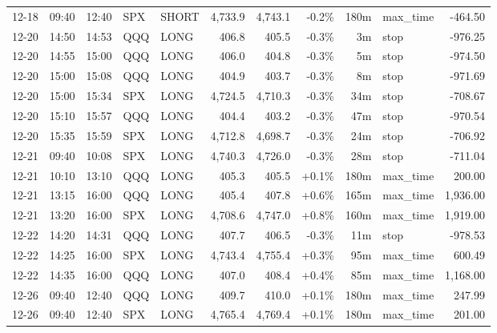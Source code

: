 \documentclass[11pt,a4paper,twoside]{article}
\begin{document}
\begin{center}
\begin{longtable}{>{\color{txtmain}}l l l l l r r r r >{\color{txtmain}}l r}
12-18 & 09:40 & 12:40 & SPX & SHORT & 4,733.9 & 4,743.1 & \textcolor{lossred}{-0.2\%} & 180m & max\_time & \textcolor{lossred}{-464.50} \\
12-20 & 14:50 & 14:53 & QQQ & LONG & 406.8 & 405.5 & \textcolor{lossred}{-0.3\%} & 3m & stop & \textcolor{lossred}{-976.25} \\
12-20 & 14:55 & 15:00 & QQQ & LONG & 406.0 & 404.8 & \textcolor{lossred}{-0.3\%} & 5m & stop & \textcolor{lossred}{-974.50} \\
12-20 & 15:00 & 15:08 & QQQ & LONG & 404.9 & 403.7 & \textcolor{lossred}{-0.3\%} & 8m & stop & \textcolor{lossred}{-971.69} \\
12-20 & 15:00 & 15:34 & SPX & LONG & 4,724.5 & 4,710.3 & \textcolor{lossred}{-0.3\%} & 34m & stop & \textcolor{lossred}{-708.67} \\
12-20 & 15:10 & 15:57 & QQQ & LONG & 404.4 & 403.2 & \textcolor{lossred}{-0.3\%} & 47m & stop & \textcolor{lossred}{-970.54} \\
12-20 & 15:35 & 15:59 & SPX & LONG & 4,712.8 & 4,698.7 & \textcolor{lossred}{-0.3\%} & 24m & stop & \textcolor{lossred}{-706.92} \\
12-21 & 09:40 & 10:08 & SPX & LONG & 4,740.3 & 4,726.0 & \textcolor{lossred}{-0.3\%} & 28m & stop & \textcolor{lossred}{-711.04} \\
12-21 & 10:10 & 13:10 & QQQ & LONG & 405.3 & 405.5 & \textcolor{wingreen}{+0.1\%} & 180m & max\_time & \textcolor{wingreen}{200.00} \\
12-21 & 13:15 & 16:00 & QQQ & LONG & 405.4 & 407.8 & \textcolor{wingreen}{+0.6\%} & 165m & max\_time & \textcolor{wingreen}{1,936.00} \\
12-21 & 13:20 & 16:00 & SPX & LONG & 4,708.6 & 4,747.0 & \textcolor{wingreen}{+0.8\%} & 160m & max\_time & \textcolor{wingreen}{1,919.00} \\
12-22 & 14:20 & 14:31 & QQQ & LONG & 407.7 & 406.5 & \textcolor{lossred}{-0.3\%} & 11m & stop & \textcolor{lossred}{-978.53} \\
12-22 & 14:25 & 16:00 & SPX & LONG & 4,743.4 & 4,755.4 & \textcolor{wingreen}{+0.3\%} & 95m & max\_time & \textcolor{wingreen}{600.49} \\
12-22 & 14:35 & 16:00 & QQQ & LONG & 407.0 & 408.4 & \textcolor{wingreen}{+0.4\%} & 85m & max\_time & \textcolor{wingreen}{1,168.00} \\
12-26 & 09:40 & 12:40 & QQQ & LONG & 409.7 & 410.0 & \textcolor{wingreen}{+0.1\%} & 180m & max\_time & \textcolor{wingreen}{247.99} \\
12-26 & 09:40 & 12:40 & SPX & LONG & 4,765.4 & 4,769.4 & \textcolor{wingreen}{+0.1\%} & 180m & max\_time & \textcolor{wingreen}{201.00} \\

\end{longtable}
\end{center}
\end{document}
